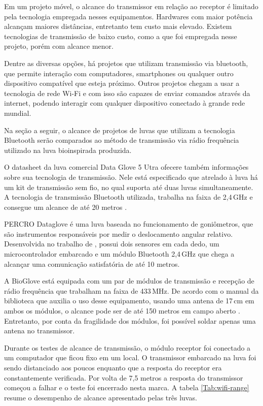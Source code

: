 \documentclass[
	12pt,				%
	openright,			%
	oneside,			%
	a4paper,			%
	english,			%
	brazil				%
	]{abntex2}
\begin{document}
			Em um projeto móvel, o alcance do transmissor em relação ao receptor é limitado pela tecnologia empregada nesses equipamentos. Hardwares com maior potência alcançam maiores distâncias, entretanto tem custo mais elevado. Existem tecnologias de transmissão de baixo custo, como a que foi empregada nesse projeto, porém com alcance menor. 
			
			Dentre as diversas opções, há projetos que utilizam transmissão via bluetooth, que permite interação com computadores, smartphones ou qualquer outro dispositivo compatível que esteja próximo. Outros projetos chegam a usar a tecnologia de rede Wi-Fi e com isso são capazes de enviar comandos através da internet, podendo interagir com qualquer dispositivo conectado à grande rede mundial. 

			Na seção a seguir, o alcance de projetos de luvas que utilizam a tecnologia Bluetooth serão comparados ao método de transmissão via rádio frequência utilizado na luva bioinspirada produzida.

			O datasheet da luva comercial Data Glove 5 Utra ofecere também informações sobre sua tecnologia de transmissão. Nele está especificado que atrelado à luva há um kit de transmissão sem fio, no qual suporta até duas luvas simultaneamente. A tecnologia de transmissão Bluetooth utilizada, trabalha na faixa de 2,4$\,$GHz e consegue um alcance de até 20 metros \cite{5DT-ultra}.

			PERCRO Dataglove é uma luva baseada no funcionamento de goniômetros, que são instrumentos responsáveis por medir o deslocamento angular relativo. Desenvolvida no trabalho de \cite{rodriguez2007goniometric}, possui dois sensores em cada dedo, um microcontrolador embarcado e um módulo Bluetooth 2,4$\,$GHz que chega a alcançar uma comunicação satisfatória de até 10 metros.

			A BioGlove está equipada com um par de módulos de transmissão e recepção de rádio frequência que trabalham na faixa de 433$\,$MHz. De acordo com o manual da biblioteca que auxilia o uso desse equipamento, usando uma antena de 17$\,$cm em ambos os módulos, o alcance pode ser de até 150 metros em campo aberto \cite{virtualwiremanual}. Entretanto, por conta da fragilidade dos módulos, foi possível soldar apenas uma antena no transmissor.

			Durante os testes de alcance de transmissão, o módulo receptor foi conectado a um computador que ficou fixo em um local. O transmissor embarcado na luva foi sendo distanciado aos poucos enquanto que a resposta do receptor era constantemente verificada. Por volta de 7,5 metros a resposta do transmissor começou a falhar e o teste foi encerrado nesta marca. A tabela \ref{Tab:wifi-range} resume o desempenho de alcance apresentado pelas três luvas.
\end{document}
